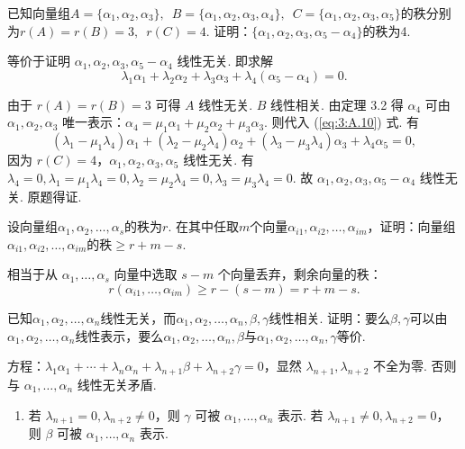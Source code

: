 \begin{exercise}
\begin{exgroup}
        \item 已知向量组$A=\{\alpha_1,\alpha_2,\alpha_3\},\enspace B=\{\alpha_1,\alpha_2,\alpha_3,\alpha_4\},\enspace C=\{\alpha_1,\alpha_2,\alpha_3,\alpha_5\}$的秩分别为$r(A)=r(B)=3,\enspace r(C)=4$. 证明：$\{\alpha_1,\alpha_2,\alpha_3,\alpha_5-\alpha_4\}$的秩为4.
        \begin{answer}
            等价于证明 $\alpha_1,\alpha_2,\alpha_3,\alpha_5-\alpha_4$ 线性无关. 即求解
            \begin{equation}
                \lambda_1\alpha_1+\lambda_2\alpha_2+\lambda_3\alpha_3+\lambda_4(\alpha_5-\alpha_4)=0. \tag{*} \label{eq:3:A.10}
            \end{equation}

            由于 $r(A)=r(B)=3$ 可得 $A$ 线性无关. $B$ 线性相关. 由定理 3.2 得 $\alpha_4$ 可由 $\alpha_1,\alpha_2,\alpha_3$ 唯一表示：$\alpha_4=\mu_1\alpha_1+\mu_2\alpha_2+\mu_3\alpha_3$. 则代入 (\ref*{eq:3:A.10}) 式. 有
            \[(\lambda_1-\mu_1\lambda_4)\alpha_1+(\lambda_2-\mu_2\lambda_4)\alpha_2+(\lambda_3-\mu_3\lambda_4)\alpha_3+\lambda_4\alpha_5=0,\]
            因为 $r(C)=4$，$\alpha_1,\alpha_2,\alpha_3,\alpha_5$ 线性无关. 有 $\lambda_4=0,\lambda_1=\mu_1\lambda_4=0,\lambda_2=\mu_2\lambda_4=0,\lambda_3=\mu_3\lambda_4=0$. 故 $\alpha_1,\alpha_2,\alpha_3,\alpha_5-\alpha_4$ 线性无关. 原题得证.
        \end{answer}

        \item 设向量组$\alpha_1,\alpha_2,\ldots,\alpha_s$的秩为$r$. 在其中任取$m$个向量$\alpha_{i1},\alpha_{i2},\ldots,\alpha_{im}$，证明：向量组$\alpha_{i1},\alpha_{i2},\ldots,\alpha_{im}$的秩$\geqslant r+m-s$.
        \begin{answer}
            相当于从 $\alpha_1,\ldots,\alpha_s$ 向量中选取 $s-m$ 个向量丢弃，剩余向量的秩：
            \[r(\alpha_{i1},\ldots,\alpha_{im})\geqslant r-(s-m) =r+m-s.\]
        \end{answer}

        \item 已知$\alpha_1,\alpha_2,\ldots,\alpha_n$线性无关，而$\alpha_1,\alpha_2,\ldots,\alpha_n,\beta,\gamma$线性相关. 证明：要么$\beta,\gamma$可以由$\alpha_1,\alpha_2,\ldots,\alpha_n$线性表示，要么$\alpha_1,\alpha_2,\ldots,\alpha_n,\beta$与$\alpha_1,\alpha_2,\ldots,\alpha_n,\gamma$等价.
        \begin{answer}
            方程：$\lambda_1\alpha_1+\cdots+\lambda_n\alpha_n+\lambda_{n+1}\beta+\lambda_{n+2}\gamma=0$，显然 $\lambda_{n+1},\lambda_{n+2}$ 不全为零. 否则与 $\alpha_1,\ldots,\alpha_n$ 线性无关矛盾.
            \begin{enumerate}
                \item 若 $\lambda_{n+1}=0,\lambda_{n+2}\neq 0$，则 $\gamma$ 可被 $\alpha_1,\ldots,\alpha_n$ 表示. 若 $\lambda_{n+1}\neq0,\lambda_{n+2}=0$， 则 $\beta$ 可被 $\alpha_1,\ldots,\alpha_n$ 表示.


\end{enumerate}
\end{answer}
\end{exgroup}
\end{exercise}
